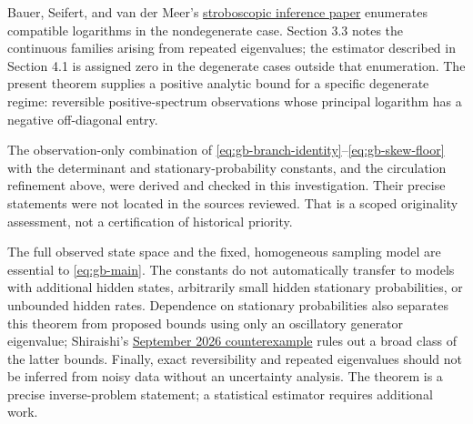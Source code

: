Bauer, Seifert, and van der Meer's
\href{https://arxiv.org/html/2412.15642v2}{stroboscopic inference paper}
enumerates compatible logarithms in the nondegenerate case. Section
3.3 notes the continuous families arising from repeated eigenvalues;
the estimator described in Section 4.1 is assigned zero in the
degenerate cases outside that enumeration. The present theorem
supplies a positive analytic bound for a specific degenerate regime:
reversible positive-spectrum observations whose principal logarithm
has a negative off-diagonal entry.

The observation-only combination of
\eqref{eq:gb-branch-identity}--\eqref{eq:gb-skew-floor} with the
determinant and stationary-probability constants, and the circulation
refinement above, were derived and checked in this investigation.
Their precise statements were not located in the sources reviewed.
That is a scoped originality assessment, not a certification of
historical priority.

The full observed state space and the fixed, homogeneous sampling
model are essential to \eqref{eq:gb-main}. The constants do not
automatically transfer to models with additional hidden states,
arbitrarily small hidden stationary probabilities, or unbounded
hidden rates. Dependence on stationary probabilities also separates
this theorem from proposed bounds using only an oscillatory generator
eigenvalue; Shiraishi's
\href{https://arxiv.org/html/2609.34352v1}{September 2026 counterexample}
rules out a broad class of the latter bounds. Finally, exact
reversibility and repeated eigenvalues should not be inferred from
noisy data without an uncertainty analysis. The theorem is a precise
inverse-problem statement; a statistical estimator requires
additional work.

